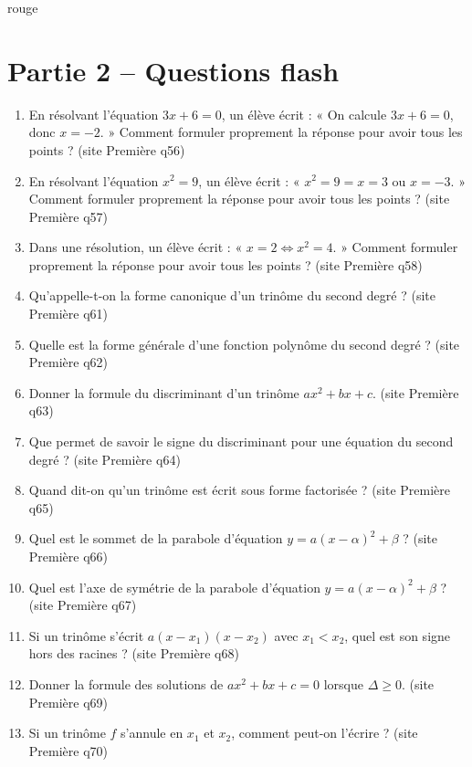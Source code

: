 \documentclass[11pt,a4paper]{article}
\newcommand{\sourceq}[1]{ {\scriptsize\textcolor{bleufonce}{(site Première q#1)}}}
\newcounter{question}
\newenvironment{blocquestions}[1]{%
  \begin{tcolorbox}[enhanced,breakable,colback=bleuclair,colframe=bleufonce,boxrule=0.6pt,arc=2mm,left=2mm,right=2mm,top=2mm,bottom=1.5mm,title={\bfseries #1},coltitle=white,colbacktitle=bleufonce,before skip=3mm,after skip=3mm, fontupper=\large]
  \large
  \begin{enumerate}[leftmargin=*,label=\textbf{\arabic*.},itemsep=0.85em,topsep=0.5em]
  \setcounter{enumi}{\value{question}}
}{%
  \setcounter{question}{\value{enumi}}
  \end{enumerate}
  \end{tcolorbox}
}
\begin{document}
\begin{landscape}
\begin{minipage}[t]{0.242\linewidth}
\begin{panel}{rouge}
\end{panel}
\end{minipage}

\end{landscape}
\clearpage
\nopagecolor
\restoregeometry
\pagestyle{fancy}

\section*{Partie 2 -- Questions flash}
\setcounter{question}{0}
\begin{blocquestions}{Questions flash -- Second degré}
  \item En résolvant l’équation $3x+6=0$, un élève écrit : « On calcule $3x+6=0$, donc $x=-2$. » Comment formuler proprement la réponse pour avoir tous les points ? \sourceq{56}
  \item En résolvant l’équation $x^2=9$, un élève écrit : « $x^2=9=x=3$ ou $x=-3$. » Comment formuler proprement la réponse pour avoir tous les points ? \sourceq{57}
  \item Dans une résolution, un élève écrit : « $x=2\Longleftrightarrow x^2=4$. » Comment formuler proprement la réponse pour avoir tous les points ? \sourceq{58}
  \item Qu’appelle-t-on la forme canonique d’un trinôme du second degré ? \sourceq{61}
  \item Quelle est la forme générale d’une fonction polynôme du second degré ? \sourceq{62}
  \item Donner la formule du discriminant d’un trinôme $ax^2+bx+c$. \sourceq{63}
  \item Que permet de savoir le signe du discriminant pour une équation du second degré ? \sourceq{64}
  \item Quand dit-on qu’un trinôme est écrit sous forme factorisée ? \sourceq{65}
  \item Quel est le sommet de la parabole d’équation $y=a(x-\alpha)^2+\beta$ ? \sourceq{66}
  \item Quel est l’axe de symétrie de la parabole d’équation $y=a(x-\alpha)^2+\beta$ ? \sourceq{67}
  \item Si un trinôme s’écrit $a(x-x_1)(x-x_2)$ avec $x_1<x_2$, quel est son signe hors des racines ? \sourceq{68}
  \item Donner la formule des solutions de $ax^2+bx+c=0$ lorsque $\Delta\geq 0$. \sourceq{69}
  \item Si un trinôme $f$ s’annule en $x_1$ et $x_2$, comment peut-on l’écrire ? \sourceq{70}

\end{blocquestions}
\end{document}
